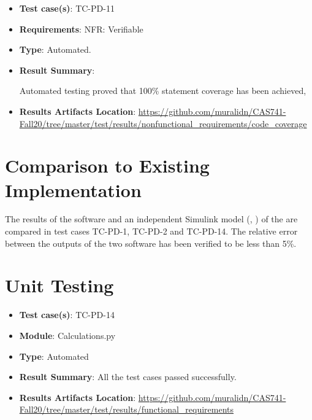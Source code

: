 \documentclass[12pt, titlepage]{article}
\begin{document}
\begin{itemize}

\item \textbf{Test case(s)}: TC-PD-11

\item \textbf{Requirements}: NFR: Verifiable

\item \textbf{Type}: Automated.

\item \textbf{Result Summary}: 

Automated testing proved that 100\% statement
coverage has been achieved,

\item \textbf{Results Artifacts Location}: \url{https://github.com/muralidn/CAS741-Fall20/tree/master/test/results/nonfunctional_requirements/code_coverage}

\end{itemize}



\section{Comparison to Existing Implementation}	

The results of the \progname{} software and an independent Simulink model (\cite{Simulink}, 
\cite{PD_Controller}) of the \progname{} are compared in test cases TC-PD-1, TC-PD-2 and 
TC-PD-14. The relative error between the outputs of the two software has been
verified to be less than 5\%.


\section{Unit Testing}

\begin{itemize}

\item \textbf{Test case(s)}: TC-PD-14

\item \textbf{Module}: Calculations.py

\item \textbf{Type}: Automated 

\item \textbf{Result Summary}: All the test cases passed successfully. 

\item \textbf{Results Artifacts Location}: \url{https://github.com/muralidn/CAS741-Fall20/tree/master/test/results/functional_requirements}

\end{itemize}
\end{document}
